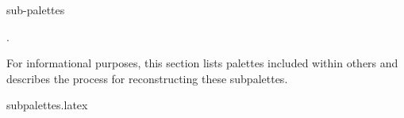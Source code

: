 \documentclass{tutodoc}
\begin{document}
                {sub-palettes}  %

\begin{tdocimp}
    \appendixaboutpalname.
\end{tdocimp}




\smallskip


For informational purposes, this section lists palettes included within others and describes the process for reconstructing these subpalettes.

{subpalettes.latex}
\end{document}
